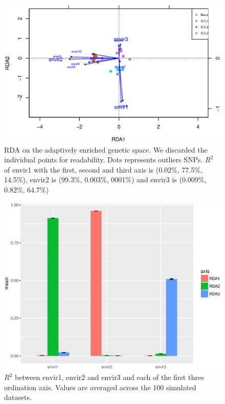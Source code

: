 \documentclass[nogrid]{MBE}%
\begin{document}
\begin{figure}[t]
\begin{center}
\includegraphics[height=0.4\textheight]{figures/rdaA.eps}
\end{center}
\caption{RDA on the adaptively enriched genetic space. We discarded the individual points for readability. Dots represents outliers SNPs.  $R^2$ of envir1 with the first, second and third axis is (0.02\%, 77.5\%, 14.5\%), envir2 is (99.3\%, 0.003\%, 0001\%) and envir3 is (0.009\%, 0.82\%, 64.7\%)}%
\label{fig:rdaA}%
\end{figure}

\begin{figure}[t]
\begin{center}
\includegraphics[height=0.21\textheight]{figures/R2.eps}
\end{center}
\caption{$R^2$ between envir1, envir2 and envir3 and each of the first three ordination axis. Values are averaged across the 100 simulated datasets.}%
\label{fig:R2}%
\end{figure}
\end{document}
